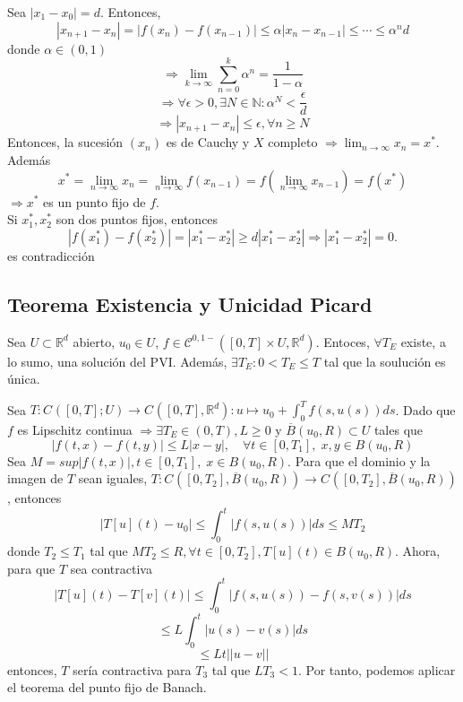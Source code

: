 \begin{dem}
  Sea $| x_{1} - x_{0} | = d$. Entonces, 
  \[ 
    | x_{n+1} - x_{n} | = | f(x_{n}) - f(x_{n-1}) | \leq \alpha | x_{n} - x_{n-1} |\leq \cdots \leq \alpha^n d
  \] 
  donde $\alpha \in (0,1)$ 
  \[
    \Rightarrow \lim_{k \to \infty}\sum_{n=0}^{k} \alpha^n = \frac{1}{1 - \alpha}
  \]
  \[
    \Rightarrow \forall \epsilon > 0, \exists N \in \mathbb{N}: \alpha^N < \frac{\epsilon}{d}
  \]
  \[ 
    \Rightarrow | x_{n+1} - x_{n} | \leq \epsilon, \forall n \geq N
  \] 
  Entonces, la sucesión $(x_{n})$ es de Cauchy y $X$ completo $\Rightarrow \lim_{n \to \infty} x_{n} = x^*$. Además
  \[ 
    x^* = \lim_{n \to \infty} x_{n} = \lim_{n \to \infty} f(x_{n-1}) = f( \lim_{n \to \infty} x_{n-1}) = f(x^*)
  \] 
  $\Rightarrow x^*$ es un punto fijo de $f$. \\

  Si $x_{1}^*, x_{2}^*$ son dos puntos fijos, entonces
  \[ 
    | f(x_{1}^*) - f(x_{2}^*) | = | x_{1}^* - x_{2}^* | \geq d | x_{1}^* - x_{2}^* | \Rightarrow | x_{1}^* - x_{2}^* | = 0.
  \] 
  es contradicción
\end{dem}

\subsection{Teorema Existencia y Unicidad Picard}

\begin{theo}
  Sea $U \subset \mathbb{R}^{d}$ abierto, $u_{0} \in U$, $f \in \mathcal{C}^{0,1-}([0, T] \times U, \mathbb{R}^{d})$. Entoces, $\forall T_{E}$ existe, a lo sumo, una solución del PVI. Además, $\exists T_{E}: 0 < T_{E} \leq T$ tal que la soulución es única.
\end{theo}

\begin{dem}
  Sea $T : C^{}([0,T]; U) \to C^{}([0, T], \mathbb{R}^{d}) : u \mapsto u_{0} + \int_{0}^{T} f(s, u(s)) ds$.  Dado que $f$ es Lipschitz continua $\Rightarrow \exists T_{E} \in (0,T), L \geq 0$ y $\overline{B}(u_{0},R)\subset U$ tales que
  \[ 
    | f(t,x) - f(t,y) | \leq L | x - y |, \quad \forall t \in [0,T_{1}], \; x,y \in B(u_{0}, R)
  \] 
  Sea $M = sup | f(t,x) |, t \in [0,T_{1}], \; x \in B(u_{0}, R)$. Para que el dominio y la imagen de $T$  sean iguales, $T : C^{}([0, T_{2}], \overline{B}(u_{0},R)) \to C^{}([0, T_{2}], \overline{B}(u_{0},R)) $, entonces
  \[ 
    | T[u](t) - u_{0} | \leq \int_{0}^{t} | f(s, u(s)) | ds \leq M T_{2}
  \] 
  donde $T_{2} \leq T_{1}$ tal que $MT_{2} \leq R, \forall t \in [0, T_{2}], T[u](t) \in B(u_{0}, R)$. Ahora, para que $T$ sea contractiva
  \[ 
    | T[u](t) - T[v](t) | \leq \int_{0}^{t} | f(s, u(s)) - f(s, v(s)) | ds 
  \] 
  \[ 
    \leq L \int_{0}^{t} | u(s) - v(s) | ds  
  \] 
  \[ 
    \leq Lt ||u - v|| 
  \] 
  entonces, $T$ sería contractiva para $T_{3}$ tal que $L T_{3} < 1$. Por tanto, podemos aplicar el teorema del punto fijo de Banach.
\end{dem}

